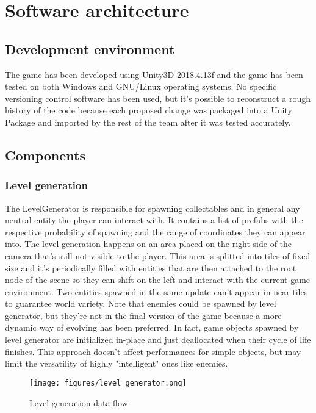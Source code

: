 \documentclass[11pt]{article}
\begin{document}
\section{Software architecture}
\subsection{Development environment}
The game has been developed using Unity3D 2018.4.13f and the game has been tested on both Windows and GNU/Linux operating systems. No specific versioning control software has been used, but it's possible to reconstruct a rough history of the code because each proposed change was packaged into a Unity Package and imported by the rest of the team after it was tested accurately.

\subsection{Components}
\subsubsection{Level generation}
The LevelGenerator is responsible for spawning collectables and in general any neutral entity the player can interact with.
It contains a list of prefabs with the respective probability of spawning and the range of coordinates they can appear into.
The level generation happens on an area placed on the right side of the camera that's still not visible to the player.
This area is splitted into tiles of fixed size and it's periodically filled with entities that are then attached to the root node of the scene so they can shift on the left and interact with the current game environment. Two entities spawned in the same update can't appear in near tiles to guarantee world variety.
Note that enemies could be spawned by level generator, but they're not in the final version of the game because a more dynamic way of evolving has been preferred. In fact, game objects spawned by level generator are initialized in-place and just deallocated when their cycle of life finishes. This approach doesn't affect performances for simple objects, but may limit the versatility of highly "intelligent" ones like enemies.

\begin{figure}[H]
  \centering
  \texttt{[image: figures/level\_generator.png]}
  \caption{Level generation data flow}
\end{figure}
\end{document}
